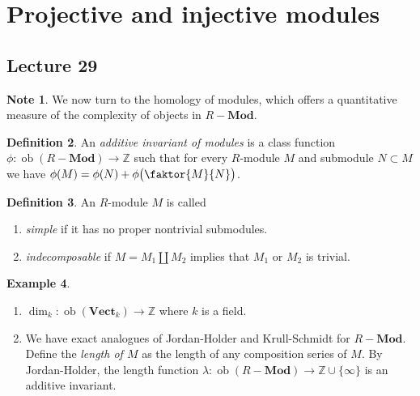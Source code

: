 \documentclass[10pt,letterpaper,cm]{nupset}
\theoremstyle{definition}
\newtheorem{definition}{Definition}[subsection]
\newtheorem{exmp}[definition]{Example}
\newtheorem{note}[definition]{Note}
\theoremstyle{theorem}
\theoremstyle{remark}
\newcommand{\Z}{\mathbb Z}
\newcommand{\1}{\mathbf{1}}
\newcommand{\0}{\vec 0}
\DeclareMathOperator{\ob}{ob}
\begin{document}
\section{Projective and injective modules}

\subsection{Lecture 29}

\begin{note}
We now turn to the homology of modules, which offers a quantitative measure of the complexity of objects in $R{-}\mathbf{Mod}$.
\end{note}

\begin{definition}
An \textit{additive invariant of modules} is a class function $\phi : \ob(R{-} \mathbf{Mod}) \to \Z$ such that for every $R$-module $M$ and submodule $N\subset M$ we have $\phi(M) = \phi(N) + \phi \big(\faktor{M}{N} \big)$. 
\end{definition}

\begin{definition} An $R$-module $M$ is called
\begin{enumerate}
\item \textit{simple} if it has no proper nontrivial submodules.
\item \textit{indecomposable} if $M = M_1 \coprod M_2$ implies that $M_1$ or $M_2$ is trivial.
\end{enumerate}
\end{definition}

\begin{exmp} $ $
\begin{enumerate}
\item $\dim_k : \ob(\mathbf{Vect}_k) \to \Z$ where $k$ is a field.
\item  
We have exact analogues of Jordan-Holder and Krull-Schmidt for $R{-}\mathbf{Mod}$. Define the \textit{length of $M$} as the length of any composition series of $M$. By Jordan-Holder, the length function $\lambda : \ob(R{-} \mathbf{Mod}) \to \Z \cup \{\infty\}$ is an additive invariant.
\end{enumerate}
\end{exmp}
\end{document}
